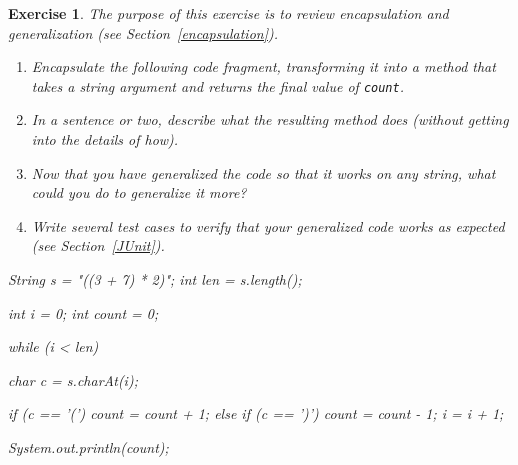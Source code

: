 \documentclass[12pt]{book}
\theoremstyle{exercise}
\newtheorem{exercise}{Exercise}[chapter]
\newcommand{\java}[1]{\verb"#1"}
\newcommand{\java}[1]{\lstinline{#1}} %
\begin{document}
\begin{exercise}

The purpose of this exercise is to review encapsulation and generalization (see Section~\ref{encapsulation}).

\begin{enumerate}

\item Encapsulate the following code fragment, transforming it into a method that takes a string argument and returns the final value of \java{count}.

\item In a sentence or two, describe what the resulting method does (without getting into the details of how).

\item Now that you have generalized the code so that it works on any string, what could you do to generalize it more?

\item Write several test cases to verify that your generalized code works as expected (see Section~\ref{JUnit}).

\end{enumerate}

\begin{code}
    String s = "((3 + 7) * 2)";
    int len = s.length();
    
    int i = 0;
    int count = 0;
    
    while (i < len) {
        char c = s.charAt(i);
        
        if (c == '(') {
            count = count + 1;
        } else if (c == ')') {
            count = count - 1;
        }
        i = i + 1;
    }
    
    System.out.println(count);
\end{code}

\end{exercise}
\end{document}
